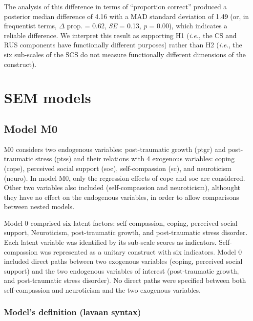 \documentclass[aps,floatfix,prl]{revtex4}
\begin{document}
The analysis of this difference in terms of ``proportion correct''
produced a posterior median difference of 4.16 with a MAD standard
deviation of 1.49 (or, in frequentist terms, \(\Delta\) prop. = 0.62,
\emph{SE} = 0.13, \emph{p} = 0.00), which indicates a reliable
difference. We interpret this result as supporting H1 (\emph{i.e.}, the
CS and RUS components have functionally different purposes) rather than
H2 (\emph{i.e.}, the six sub-scales of the SCS do not measure
functionally different dimensions of the construct).

\newpage

\hypertarget{sem-models}{%
\section{SEM models}\label{sem-models}}

\hypertarget{model-m0}{%
\subsection{Model M0}\label{model-m0}}

M0 considers two endogenous variables: post-traumatic growth (ptgr) and
post-traumatic stress (ptss) and their relations with 4 exogenous
variables: coping (cope), perceived social support (soc),
self-compassion (sc), and neuroticism (neuro). In model M0, only the
regression effects of cope and soc are considered. Other two variables
also included (self-compassion and neuroticism), althought they have no
effect on the endogenous variables, in order to allow comparisons
between nested models.

Model 0 comprised six latent factors: self-compassion, coping, perceived
social support, Neuroticism, post-traumatic growth, and post-traumatic
stress disorder. Each latent variable was identified by its sub-scale
scores as indicators. Self-compassion was represented as a unitary
construct with six indicators. Model 0 included direct paths between two
exogenous variables (coping, perceived social support) and the two
endogenous variables of interest (post-traumatic growth, and
post-traumatic stress disorder). No direct paths were specified between
both self-compassion and neuroticism and the two exogenous variables.

\hypertarget{models-definition-lavaan-syntax}{%
\subsubsection{Model's definition (lavaan
syntax)}\label{models-definition-lavaan-syntax}}
\end{document}
